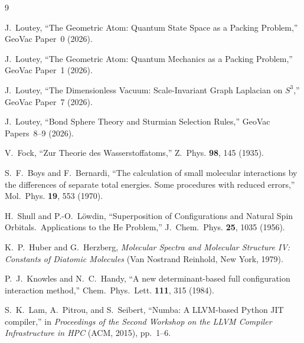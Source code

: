 \documentclass[aps,pra,twocolumn,superscriptaddress,longbibliography]{revtex4-2}
\begin{document}
\begin{thebibliography}{9}

J.~Loutey, ``The Geometric Atom: Quantum State Space as a Packing Problem,''
GeoVac Paper~0 (2026).

J.~Loutey, ``The Geometric Atom: Quantum Mechanics as a Packing Problem,''
GeoVac Paper~1 (2026).

J.~Loutey, ``The Dimensionless Vacuum: Scale-Invariant Graph Laplacian
on $S^3$,'' GeoVac Paper~7 (2026).

J.~Loutey, ``Bond Sphere Theory and Sturmian Selection Rules,''
GeoVac Papers~8--9 (2026).

V.~Fock, ``Zur Theorie des Wasserstoffatoms,''
Z.~Phys. \textbf{98}, 145 (1935).

S.~F.~Boys and F.~Bernardi, ``The calculation of small molecular
interactions by the differences of separate total energies.  Some
procedures with reduced errors,''
Mol.~Phys. \textbf{19}, 553 (1970).

H.~Shull and P.-O.~L\"owdin, ``Superposition of Configurations and
Natural Spin Orbitals.\ Applications to the He Problem,''
J.~Chem.~Phys. \textbf{25}, 1035 (1956).

K.~P.~Huber and G.~Herzberg, \emph{Molecular Spectra and Molecular
Structure IV: Constants of Diatomic Molecules}
(Van Nostrand Reinhold, New York, 1979).

P.~J.~Knowles and N.~C.~Handy, ``A new determinant-based full
configuration interaction method,''
Chem.~Phys.~Lett. \textbf{111}, 315 (1984).

S.~K.~Lam, A.~Pitrou, and S.~Seibert, ``Numba: A LLVM-based Python
JIT compiler,'' in \emph{Proceedings of the Second Workshop on the LLVM
Compiler Infrastructure in HPC} (ACM, 2015), pp.~1--6.

\end{thebibliography}
\end{document}
